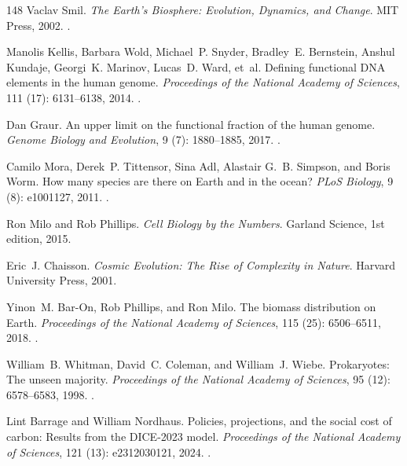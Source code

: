 \documentclass[11pt]{article}
\theoremstyle{plain}
\theoremstyle{definition}
\theoremstyle{remark}
\begin{document}
\begin{thebibliography}{148}
Vaclav Smil.
\newblock \emph{The Earth's Biosphere: Evolution, Dynamics, and Change}.
\newblock MIT Press, 2002.
\newblock {}.

Manolis Kellis, Barbara Wold, Michael~P. Snyder, Bradley~E. Bernstein, Anshul
  Kundaje, Georgi~K. Marinov, Lucas~D. Ward, et~al.
\newblock Defining functional {DNA} elements in the human genome.
\newblock \emph{Proceedings of the National Academy of Sciences}, 111
  (17): 6131--6138, 2014.
\newblock {}.

Dan Graur.
\newblock An upper limit on the functional fraction of the human genome.
\newblock \emph{Genome Biology and Evolution}, 9 (7):
  1880--1885, 2017.
\newblock {}.

Camilo Mora, Derek~P. Tittensor, Sina Adl, Alastair G.~B. Simpson, and Boris
  Worm.
\newblock How many species are there on {Earth} and in the ocean?
\newblock \emph{PLoS Biology}, 9 (8): e1001127, 2011.
\newblock {}.

Ron Milo and Rob Phillips.
\newblock \emph{Cell Biology by the Numbers}.
\newblock Garland Science, 1st edition, 2015.

Eric~J. Chaisson.
\newblock \emph{Cosmic Evolution: The Rise of Complexity in Nature}.
\newblock Harvard University Press, 2001.

Yinon~M. Bar-On, Rob Phillips, and Ron Milo.
\newblock The biomass distribution on {Earth}.
\newblock \emph{Proceedings of the National Academy of Sciences}, 115
  (25): 6506--6511, 2018.
\newblock {}.

William~B. Whitman, David~C. Coleman, and William~J. Wiebe.
\newblock Prokaryotes: The unseen majority.
\newblock \emph{Proceedings of the National Academy of Sciences}, 95
  (12): 6578--6583, 1998.
\newblock {}.

Lint Barrage and William Nordhaus.
\newblock Policies, projections, and the social cost of carbon: Results from
  the {DICE-2023} model.
\newblock \emph{Proceedings of the National Academy of Sciences}, 121
  (13): e2312030121, 2024.
\newblock {}.


\end{thebibliography}
\end{document}

